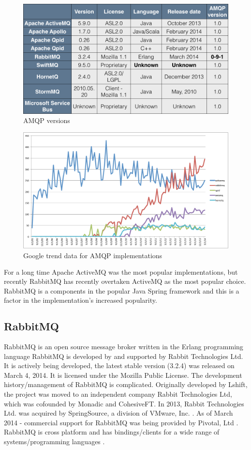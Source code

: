 \documentclass{thesis}
\begin{document}
\begin{figure}[ht]
\centering
\includegraphics[scale=.40]{table_of_amqp_message_brokers}  
\caption{AMQP versions}
\label{fig:amqp-broker-table}
\end{figure}

\begin{figure}[ht]
\centering
\includegraphics[scale=.5]{broker_popularity}  
\caption{Google trend data for AMQP implementations}
\label{fig:google-trend}
\end{figure}

For a long time Apache ActiveMQ was the most popular implementations, but recently RabbitMQ has recently overtaken ActiveMQ as the most popular choice.  RabbitMQ is a components in the popular Java Spring framework and this is a factor in the implementation's increased popularity. 

\subsection{RabbitMQ}
RabbitMQ is an open source message broker written in the Erlang programming language \cite{RABBITMQ} RabbitMQ is developed by and supported by Rabbit Technologies Ltd.  It is actively being developed, the latest stable version (3.2.4) was released on March 4, 2014.  It is licensed under the Mozilla Public License.  The development history/management of RabbitMQ is complicated.  Originally developed by Lshift, the project was moved to an independent company Rabbit Technologies Ltd, which was cofounded by Monadic and CohesiveFT.  In 2013, Rabbit Technologies Ltd. was acquired by SpringSource, a division of VMware, Inc. \cite{LSHIFT}.  As of March 2014 - commercial support for RabbitMQ was being provided by Pivotal, Ltd \cite{PIVOTAL}.  RabbitMQ is cross platform and has bindings/clients for a wide range of systems/programming languages \cite{RABBITMQ_CLIENTS}.  
\end{document}
